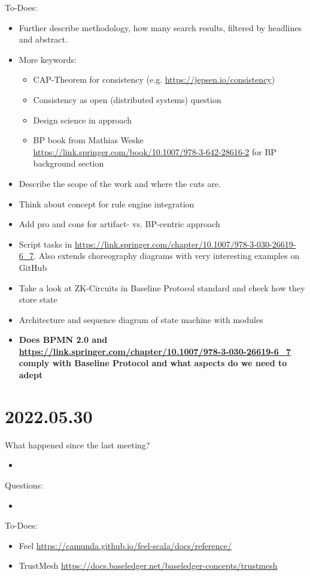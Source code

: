 To-Does:
\begin{itemize}
    \item Further describe methodology, how many search results, filtered by headlines and abstract.
    \item More keywords:
    \begin{itemize}
        \item CAP-Theorem for consistency (e.g. \url{https://jepsen.io/consistency})
        \item Consistency as open (distributed systems) question
        \item Design science in approach
        \item BP book from Mathias Weske \url{https://link.springer.com/book/10.1007/978-3-642-28616-2} for BP background section
    \end{itemize}
    \item Describe the scope of the work and where the cuts are.
    \item Think about concept for rule engine integration
    \item Add pro and cons for artifact- vs. BP-centric approach
    \item Script tasks in \url{https://link.springer.com/chapter/10.1007/978-3-030-26619-6_7}. Also extends choreography diagrams with very interesting examples on GitHub
    \item Take a look at ZK-Circuits in Baseline Protocol standard and check how they store state
    \item Architecture and sequence diagram of state machine with modules
    \item \textbf{Does BPMN 2.0 and \url{https://link.springer.com/chapter/10.1007/978-3-030-26619-6_7} comply with Baseline Protocol and what aspects do we need to adept}
\end{itemize}


\section{2022.05.30}
What happened since the last meeting?
\begin{itemize}
    \item
\end{itemize}

Questions:
\begin{itemize}
    \item
\end{itemize}

To-Does:
\begin{itemize}
    \item Feel \url{https://camunda.github.io/feel-scala/docs/reference/}
    \item TrustMesh \url{https://docs.baseledger.net/baseledger-concepts/trustmesh}
\end{itemize}


